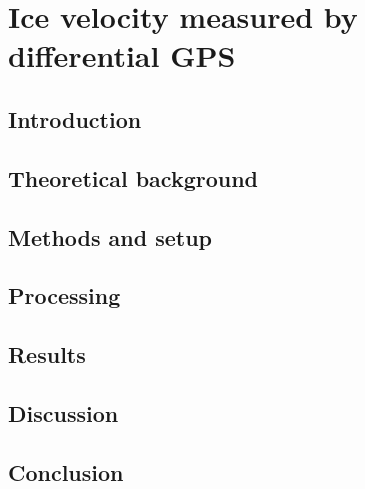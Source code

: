 

\renewcommand{\chapterauthor}{Moritz Bitterling, Linda Thielke, Julien-Pooya Weihs}
\chapter{Ice velocity measured by differential GPS}
\label{gpsmeas}

\begin{abstract}

\end{abstract}


\section{Introduction}


\section{Theoretical background} \label{GPS:sec:Theoretical backround}


\section{Methods and setup} \label{GPS:sec:Methods and setup}


\section{Processing} \label{GPS:sec:Processing}


\section{Results} \label{GPS:sec:Results}


\section{Discussion} \label{GPS:sec:Discussion}


\section{Conclusion}




